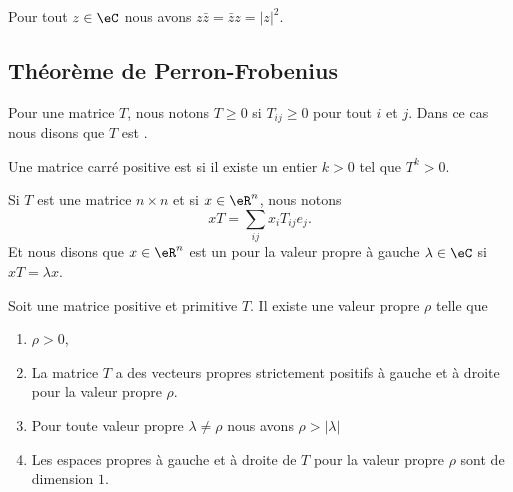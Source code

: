 \begin{lemma}   \label{LEMooONLNooXLNbtB}
	Pour tout \( z\in \eC\) nous avons \( z\bar z=\bar z z=| z |^2\).
\end{lemma}

\subsection{Théorème de Perron-Frobenius}

\begin{definition}
	Pour une matrice \( T\), nous notons \( T\geq 0\) si \( T_{ij}\geq 0\) pour tout \( i\) et \( j\). Dans ce cas nous disons que \( T\) est .

	Une matrice carré positive est  si il existe un entier \( k>0\) tel que \( T^k>0\).
\end{definition}

\begin{definition}      \label{DEFooRFQCooQrLPVw}
	Si \( T\) est une matrice \( n\times n\) et si \( x\in \eR^n\), nous notons
	\begin{equation}
		xT=\sum_{ij}x_iT_{ij}e_j.
	\end{equation}
	Et nous disons que \( x\in \eR^n\) est un  pour la valeur propre à gauche \( \lambda\in \eC\) si \( xT=\lambda x\).
\end{definition}

\begin{theorem}       \label{THOooRSPJooMCFeeP}
	Soit une matrice positive et primitive \( T\). Il existe une valeur propre \( \rho\) telle que
	\begin{enumerate}
		\item
		      \( \rho>0\),
		\item
		      La matrice \( T\) a des vecteurs propres strictement positifs à gauche et à droite pour la valeur propre \( \rho\).
		\item
		      Pour toute valeur propre \( \lambda\neq \rho\) nous avons \( \rho>| \lambda |\)
		\item
		      Les espaces propres à gauche et à droite de \( T\) pour la valeur propre \( \rho\) sont de dimension \( 1\).
	\end{enumerate}
\end{theorem}

